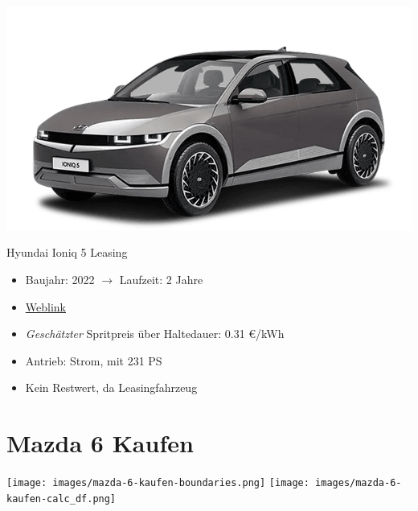 \documentclass[landscape, DIV=99, 14pt]{scrartcl}
\begin{document}
\pagebreak
\null
\vspace{2cm}
\begin{center}
\includegraphics[width=0.9\columnwidth]{cars/hyundai-ioniq-5.png}

Hyundai Ioniq 5 Leasing
\end{center}

\begin{itemize}
    \item Baujahr: 2022 $\rightarrow$ Laufzeit: 2 Jahre
    \item \href{https://konfigurator.meinauto.de/hyundai/neuwagen/ioniq/angebote/ioniq-5/konfigurator/\#!/extras/-/8865700/14,19,41/private/104690-6897-293274/4864/61e90b0c48e55/leasing/104690-6897-293274/24,9000,15000,0,0,0,0,0,}{Weblink}
    \item \emph{Gesch\"atzter} Spritpreis \"uber Haltedauer: 0.31 \euro{}/kWh
    \item Antrieb: Strom, mit 231 PS
    \item Kein Restwert, da Leasingfahrzeug
\end{itemize}

\pagebreak


\twocolumn

\section*{Mazda 6 Kaufen}
\begin{center}
\texttt{[image: images/mazda-6-kaufen-boundaries.png]}
\null
\vspace{0.5cm}
\texttt{[image: images/mazda-6-kaufen-calc\_df.png]}
\end{center}
\end{document}

